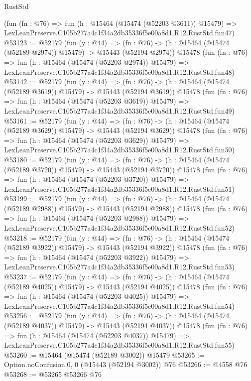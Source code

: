 \begin{lexlean}{RustStd}
\begin{coremodule}
    (fun (fn : @76) =>
    fun (h : @15464 (@15474 (@52203 @3611)) @15479) =>
    LexLeanPreserve.C105b277a4c1f34a2db35336f5e00a8d1.R12.RustStd.fun47)
@53123 := @52179
    (fun (y : @44) =>
    (fn : @76) -> (h : @15464 (@15474 (@52189 @2974)) @15479) -> @15443 (@52194 @2974))
    @15478
    (fun (fn : @76) =>
    fun (h : @15464 (@15474 (@52203 @2974)) @15479) =>
    LexLeanPreserve.C105b277a4c1f34a2db35336f5e00a8d1.R12.RustStd.fun48)
@53142 := @52179
    (fun (y : @44) =>
    (fn : @76) -> (h : @15464 (@15474 (@52189 @3619)) @15479) -> @15443 (@52194 @3619))
    @15478
    (fun (fn : @76) =>
    fun (h : @15464 (@15474 (@52203 @3619)) @15479) =>
    LexLeanPreserve.C105b277a4c1f34a2db35336f5e00a8d1.R12.RustStd.fun49)
@53161 := @52179
    (fun (y : @44) =>
    (fn : @76) -> (h : @15464 (@15474 (@52189 @3629)) @15479) -> @15443 (@52194 @3629))
    @15478
    (fun (fn : @76) =>
    fun (h : @15464 (@15474 (@52203 @3629)) @15479) =>
    LexLeanPreserve.C105b277a4c1f34a2db35336f5e00a8d1.R12.RustStd.fun50)
@53180 := @52179
    (fun (y : @44) =>
    (fn : @76) -> (h : @15464 (@15474 (@52189 @3720)) @15479) -> @15443 (@52194 @3720))
    @15478
    (fun (fn : @76) =>
    fun (h : @15464 (@15474 (@52203 @3720)) @15479) =>
    LexLeanPreserve.C105b277a4c1f34a2db35336f5e00a8d1.R12.RustStd.fun51)
@53199 := @52179
    (fun (y : @44) =>
    (fn : @76) -> (h : @15464 (@15474 (@52189 @2988)) @15479) -> @15443 (@52194 @2988))
    @15478
    (fun (fn : @76) =>
    fun (h : @15464 (@15474 (@52203 @2988)) @15479) =>
    LexLeanPreserve.C105b277a4c1f34a2db35336f5e00a8d1.R12.RustStd.fun52)
@53218 := @52179
    (fun (y : @44) =>
    (fn : @76) -> (h : @15464 (@15474 (@52189 @3922)) @15479) -> @15443 (@52194 @3922))
    @15478
    (fun (fn : @76) =>
    fun (h : @15464 (@15474 (@52203 @3922)) @15479) =>
    LexLeanPreserve.C105b277a4c1f34a2db35336f5e00a8d1.R12.RustStd.fun53)
@53237 := @52179
    (fun (y : @44) =>
    (fn : @76) -> (h : @15464 (@15474 (@52189 @4025)) @15479) -> @15443 (@52194 @4025))
    @15478
    (fun (fn : @76) =>
    fun (h : @15464 (@15474 (@52203 @4025)) @15479) =>
    LexLeanPreserve.C105b277a4c1f34a2db35336f5e00a8d1.R12.RustStd.fun54)
@53256 := @52179
    (fun (y : @44) =>
    (fn : @76) -> (h : @15464 (@15474 (@52189 @4037)) @15479) -> @15443 (@52194 @4037))
    @15478
    (fun (fn : @76) =>
    fun (h : @15464 (@15474 (@52203 @4037)) @15479) =>
    LexLeanPreserve.C105b277a4c1f34a2db35336f5e00a8d1.R12.RustStd.fun55)
@53260 := @15464 (@15474 (@52189 @3002)) @15479
@53265 := Option.noConfusion.{0, 0} (@15443 (@52194 @3002)) @76
@53266 := @4558 @76
@53268 := @53265 @53266 @76

\end{coremodule}
\end{lexlean}
